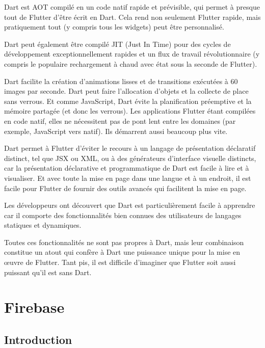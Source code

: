 \begin{list}{•}{}
\item Dart est \acrshort{AOT} compilé en un code natif rapide et prévisible, qui permet à presque tout de Flutter d'être écrit en Dart. Cela rend non seulement Flutter rapide, mais pratiquement tout (y compris tous les widgets) peut être personnalisé.
\item Dart peut également être compilé \acrshort{JIT} (Just In Time) pour des cycles de développement exceptionnellement rapides et un flux de travail révolutionnaire (y compris le populaire rechargement à chaud avec état sous la seconde de Flutter).
\item Dart facilite la création d'animations lisses et de transitions exécutées à 60 images par seconde. Dart peut faire l’allocation d’objets et la collecte de place sans verrous. Et comme JavaScript, Dart évite la planification préemptive et la mémoire partagée (et donc les verrous). Les applications Flutter étant compilées en code natif, elles ne nécessitent pas de pont lent entre les domaines (par exemple, JavaScript vers natif). Ils démarrent aussi beaucoup plus vite.
\item Dart permet à Flutter d’éviter le recours à un langage de présentation déclaratif distinct, tel que \acrshort{JSX} ou \acrshort{XML}, ou à des générateurs d’interface visuelle distincts, car la présentation déclarative et programmatique de Dart est facile à lire et à visualiser. Et avec toute la mise en page dans une langue et à un endroit, il est facile pour Flutter de fournir des outils avancés qui facilitent la mise en page.
\item Les développeurs ont découvert que Dart est particulièrement facile à apprendre car il comporte des fonctionnalités bien connues des utilisateurs de langages statiques et dynamiques.
\end{list}

Toutes ces fonctionnalités ne sont pas propres à Dart, mais leur combinaison constitue un atout qui confère à Dart une puissance unique pour la mise en œuvre de Flutter. Tant pis, il est difficile d’imaginer que Flutter soit aussi puissant qu’il est sans Dart.\cite{leler_why_2018}


\section{Firebase}
\subsection{Introduction}

